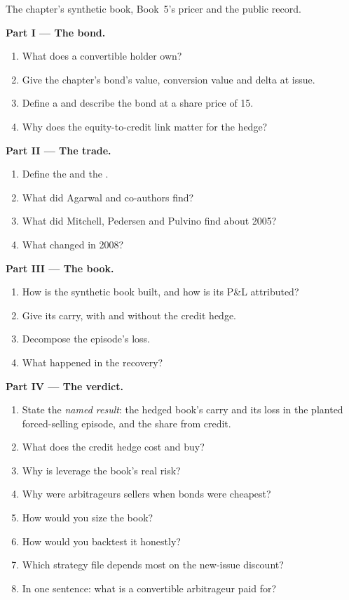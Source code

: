 \begin{problem}\label{pb:s2:convertible-arbitrage:1}
The chapter's synthetic book, Book~5's pricer and the public record.

\medskip\noindent\textbf{Part I --- The bond.}
\begin{enumerate}
\item What does a convertible holder own?
\item Give the chapter's bond's value, conversion value and delta at issue.
\item Define a  and describe the bond at a share price of 15.
\item Why does the equity-to-credit link matter for the hedge?
\end{enumerate}

\medskip\noindent\textbf{Part II --- The trade.}
\begin{enumerate}[resume]
\item Define the  and the .
\item What did Agarwal and co-authors find?
\item What did Mitchell, Pedersen and Pulvino find about 2005?
\item What changed in 2008?
\end{enumerate}

\medskip\noindent\textbf{Part III --- The book.}
\begin{enumerate}[resume]
\item How is the synthetic book built, and how is its P\&L attributed?
\item Give its carry, with and without the credit hedge.
\item Decompose the episode's loss.
\item What happened in the recovery?
\end{enumerate}

\medskip\noindent\textbf{Part IV --- The verdict.}
\begin{enumerate}[resume]
\item State the \emph{named result}: the hedged book's carry and its loss in the planted forced-selling episode, and the share from credit.
\item What does the credit hedge cost and buy?
\item Why is leverage the book's real risk?
\item Why were arbitrageurs sellers when bonds were cheapest?
\item How would you size the book?
\item How would you backtest it honestly?
\item Which strategy file depends most on the new-issue discount?
\item In one sentence: what is a convertible arbitrageur paid for?
\end{enumerate}
\end{problem}

